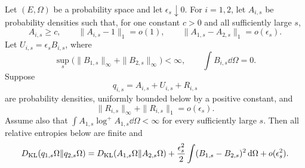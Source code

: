 \begin{lemma}
\label{lem:two-background-kl-perturbation}
Let \((E,\Omega)\) be a probability space and let
\(\epsilon_s\downarrow0\).  For \(i=1,2\), let \(A_{i,s}\) be probability
densities such that, for one constant \(c>0\) and all sufficiently large
\(s\),
\begin{equation}\label{eq:abstract-two-background-hypotheses}
 A_{i,s}\ge c,\qquad
 \|A_{i,s}-1\|_1=o(1),\qquad
 \|A_{1,s}-A_{2,s}\|_1=o(\epsilon_s).
\end{equation}
Let \(U_{i,s}=\epsilon_sB_{i,s}\), where
\begin{equation}\label{eq:abstract-two-background-modes}
 \sup_s\bigl(\|B_{1,s}\|_\infty+\|B_{2,s}\|_\infty\bigr)<\infty,
 \qquad \int B_{i,s}\dd\Omega=0.
\end{equation}
Suppose
\[
 q_{i,s}=A_{i,s}+U_{i,s}+R_{i,s}
\]
are probability densities, uniformly bounded below by a positive constant,
and
\begin{equation}\label{eq:abstract-two-background-remainders}
 \|R_{i,s}\|_\infty+\|R_{i,s}\|_1=o(\epsilon_s).
\end{equation}
Assume also that
\(\int A_{1,s}\log^+A_{1,s}\dd\Omega<\infty\) for every sufficiently
large \(s\).  Then all relative entropies below are finite and
\begin{equation}\label{eq:abstract-two-background-conclusion}
 D_{\rm KL}(q_{1,s}\Omega\|q_{2,s}\Omega)
 =D_{\rm KL}(A_{1,s}\Omega\|A_{2,s}\Omega)
 +\frac{\epsilon_s^2}{2}
   \int(B_{1,s}-B_{2,s})^2\,\mathrm{d}\Omega+o(\epsilon_s^2).
\end{equation}
\end{lemma}

